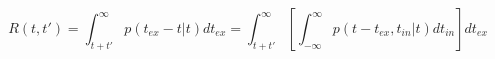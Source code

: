 \begin{equation}
R(t,t') = \int_{t+t'}^\infty p(t_{ex}-t|t) dt_{ex}  = \int_{t+t'}^\infty \left[ \int_{-\infty}^\infty p(t-t_{ex},t_{in}|t) dt_{in} \right]  dt_{ex}
\end{equation}